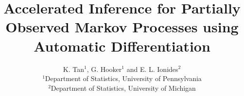 \documentclass[11pt]{article}
\newcommand\arxiv[2]{#1} %
\begin{document}
\title{Accelerated Inference for Partially Observed Markov Processes using Automatic Differentiation}


\arxiv{ \author{K. Tan$^{1}$, G. Hooker$^{1}$ and E. L. Ionides$^{2}$
  \vspace{2mm}\\
  \small{$^{1}$Department of Statistics, University of Pennsylvania}\\
  \small{$^{2}$Department of Statistics, University of Michigan}}}{}

\arxiv{}{
\author[a]{Kevin Tan}
\author[a]{Giles Hooker}
\author[b,1]{Edward L. Ionides}
\affil[a]{University of Pennsylvania}
\affil[b]{University of Michigan}
\leadauthor{Tan}
\significancestatement{Many scientific models involve highly nonlinear stochastic dynamical systems which can be observed only via noisy and incomplete measurements. Prior to this work, iterated filtering algorithms were the only class of algorithms for maximum likelihood estimation that did not require access to the system's transition probabilities, instead needing only a simulator of the system dynamics. We leverage recent advances in automatic differentiation to propose a hybrid algorithm that requires only a differentiable simulator for maximum likelihood estimation. Our new method outperforms previous approaches on a challenging problem in epidemiology.}
\authorcontributions{K.T. and E.L.I. designed research; K.T. analyzed data; K.T., G.H. and E.L.I. performed research, K.T., G.H., and E.L.I. wrote the manuscript.}
\authordeclaration{The authors declare no competing interests.}
\correspondingauthor{\textsuperscript{1}To whom correspondence should be addressed. E-mail: kevtan@wharton.upenn.edu}
\keywords{Sequential Monte Carlo $|$ Automatic Differentiation $|$ Particle Filter $|$ Markov Process $|$ Maximum Likelihood}
}
\end{document}
